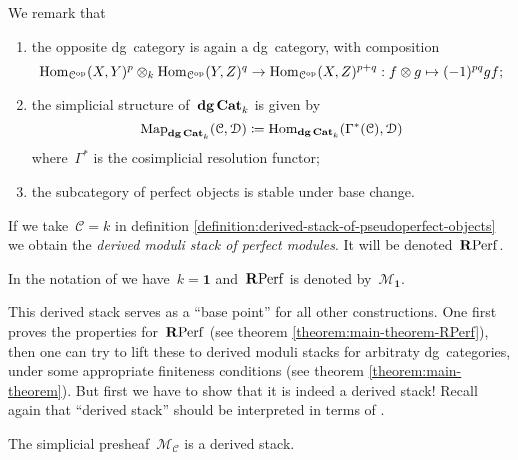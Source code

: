 \begin{refsection}
We remark that
\begin{enumerate}
  \item the opposite dg~category is again a dg~category, with composition
    \begin{equation}
      \mathrm{Hom}_{\mathcal{C}^{\mathrm{op}}}(X,Y)^p\otimes_k\mathrm{Hom}_{\mathcal{C}^{\mathrm{op}}}(Y,Z)^q\to\mathrm{Hom}_{\mathcal{C}^{\mathrm{op}}}(X,Z)^{p+q}:f\otimes g\mapsto(-1)^{pq}gf;
    \end{equation}
  \item the simplicial structure of~$\mathbf{dg\,Cat}_k$ is given by
    \begin{equation}
      \operatorname{\mathrm{Map}}_{\mathbf{dg\,Cat}_k}(\mathcal{C},\mathcal{D})\coloneqq\mathrm{Hom}_{\mathbf{dg\,Cat}_k}(\Gamma^*(\mathcal{C}),\mathcal{D})
    \end{equation}
    where~$\Gamma^*$ is the cosimplicial resolution functor;
  \item the subcategory of perfect objects is stable under base change.
\end{enumerate}

\begin{definition}
  If we take~$\mathcal{C}=k$ in definition \ref{definition:derived-stack-of-pseudoperfect-objects} we obtain the \emph{derived moduli stack of perfect modules}. It will be denoted~$\mathbf{R}\mathrm{Perf}$.
\end{definition}

In the notation of \cite{toen-vaquie} we have~$k=\mathbf{1}$ and~$\mathbf{R}\mathrm{Perf}$ is denoted by~$\mathcal{M}_{\mathbf{1}}$.

This derived stack serves as a ``base point'' for all other constructions. One first proves the properties for~$\mathbf{R}\mathrm{Perf}$ (see theorem \ref{theorem:main-theorem-RPerf}), then one can try to lift these to derived moduli stacks for arbitraty dg~categories, under some appropriate finiteness conditions (see theorem \ref{theorem:main-theorem}). But first we have to show that it is indeed a derived stack! Recall again that ``derived stack'' should be interpreted in terms of \cite[definition 1.3.2.1]{hagII}.

\begin{theorem}
  \label{theorem:derived-moduli-stack-is-stack}
  The simplicial presheaf~$\mathcal{M}_{\mathcal{C}}$ is a derived stack.


\end{theorem}
\end{refsection}
